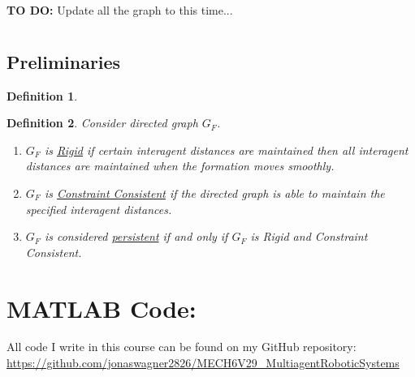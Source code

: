 \documentclass[]{article}
\numberwithin{equation}{section}
\newtheorem{definition}{Definition}
\begin{document}



\textbf{TO DO:} 
Update all the graph to this time...


\newpage
\section{}
\subsection*{Preliminaries}
\begin{definition}
    
\end{definition}
\begin{definition} \label{def:persistent}
    Consider directed graph $G_F$. 
    \begin{enumerate}
        \item $G_F$ is \emph{\underline{Rigid}} if certain interagent distances are maintained then all interagent distances are maintained when the formation moves smoothly.
        \item $G_F$ is \emph{\underline{Constraint Consistent}} if the directed graph is able to maintain the specified interagent distances.
        \item $G_F$ is considered \emph{\underline{persistent}} if and only if $G_F$ is Rigid and Constraint Consistent.
    \end{enumerate}
\end{definition}



























\newpage
\appendix
\section{MATLAB Code:}\label{apx:matlab}
All code I write in this course can be found on my GitHub repository:\\
\href{https://github.com/jonaswagner2826/MECH6V29_MultiagentRoboticSystems}{https://github.com/jonaswagner2826/MECH6V29\_MultiagentRoboticSystems}

% 

% 
% 
\end{document}

